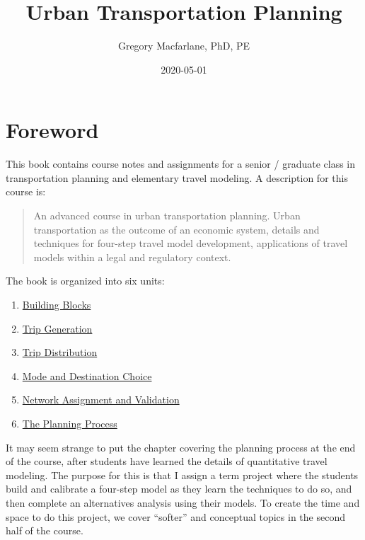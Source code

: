 \documentclass[]{book}
\title{Urban Transportation Planning}
\author{Gregory Macfarlane, PhD, PE}
\date{2020-05-01}
\providecommand{\tightlist}{%
  \setlength{\itemsep}{0pt}\setlength{\parskip}{0pt}}
\begin{document}
\maketitle

{
\setcounter{tocdepth}{1}
\tableofcontents
}
\hypertarget{syllabus}{%
\chapter*{Foreword}\label{syllabus}}

This book contains course notes and assignments for a senior / graduate class in
transportation planning and elementary travel modeling. A description for this course
is:

\begin{quote}
An advanced course in urban transportation planning. Urban transportation as
the outcome of an economic system, details and techniques for four-step travel
model development, applications of travel models within a legal and regulatory
context.
\end{quote}

The book is organized into six units:

\begin{enumerate}
\def\labelenumi{\arabic{enumi}.}
\tightlist
\item
  \protect\hyperlink{chap-blocks}{Building Blocks}
\item
  \protect\hyperlink{chap-tripgen}{Trip Generation}
\item
  \protect\hyperlink{chap-distribution}{Trip Distribution}
\item
  \protect\hyperlink{chap-modechoice}{Mode and Destination Choice}
\item
  \protect\hyperlink{chap-assignment}{Network Assignment and Validation}
\item
  \protect\hyperlink{chap-process}{The Planning Process}
\end{enumerate}

It may seem strange to put the chapter covering the planning process at the end
of the course, after students have learned the details of quantitative travel
modeling. The purpose for this is that I assign a term project where the
students build and calibrate a four-step model as they learn the techniques to do
so, and then complete an alternatives analysis using their models. To create
the time and space to do this project, we cover ``softer'' and conceptual topics
in the second half of the course.
\end{document}
